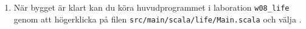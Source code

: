 \begin{enumerate}
\item När bygget är klart kan du köra huvudprogrammet i laboration \texttt{w08\_life} genom att högerklicka på filen \texttt{src/main/scala/life/Main.scala} och välja .




\end{enumerate}

%
%
%
